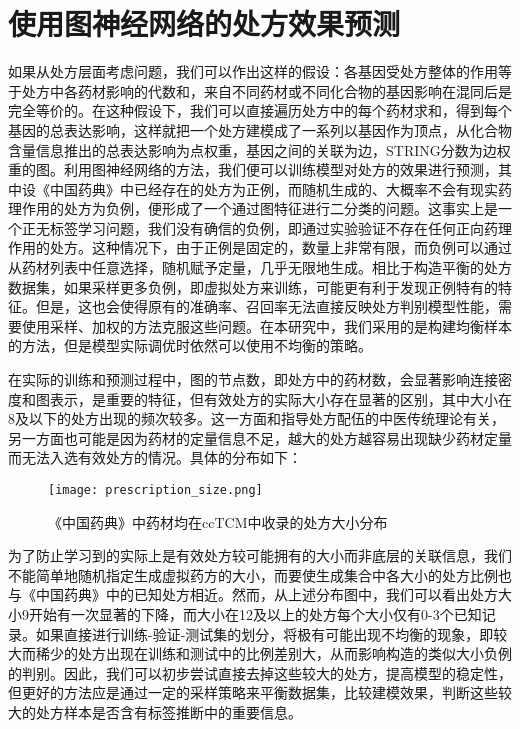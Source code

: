 \section{使用图神经网络的处方效果预测}

如果从处方层面考虑问题，我们可以作出这样的假设：各基因受处方整体的作用等于处方中各药材影响的代数和，来自不同药材或不同化合物的基因影响在混同后是完全等价的。在这种假设下，我们可以直接遍历处方中的每个药材求和，得到每个基因的总表达影响，这样就把一个处方建模成了一系列以基因作为顶点，从化合物含量信息推出的总表达影响为点权重，基因之间的关联为边，STRING分数为边权重的图。利用图神经网络的方法，我们便可以训练模型对处方的效果进行预测，其中设《中国药典》中已经存在的处方为正例，而随机生成的、大概率不会有现实药理作用的处方为负例，便形成了一个通过图特征进行二分类的问题。这事实上是一个正无标签学习问题，我们没有确信的负例，即通过实验验证不存在任何正向药理作用的处方。这种情况下，由于正例是固定的，数量上非常有限，而负例可以通过从药材列表中任意选择，随机赋予定量，几乎无限地生成。相比于构造平衡的处方数据集，如果采样更多负例，即虚拟处方来训练，可能更有利于发现正例特有的特征。但是，这也会使得原有的准确率、召回率无法直接反映处方判别模型性能，需要使用采样、加权的方法克服这些问题。在本研究中，我们采用的是构建均衡样本的方法，但是模型实际调优时依然可以使用不均衡的策略。

在实际的训练和预测过程中，图的节点数，即处方中的药材数，会显著影响连接密度和图表示，是重要的特征，但有效处方的实际大小存在显著的区别，其中大小在8及以下的处方出现的频次较多。这一方面和指导处方配伍的中医传统理论有关，另一方面也可能是因为药材的定量信息不足，越大的处方越容易出现缺少药材定量而无法入选有效处方的情况。具体的分布如下：


\begin{figure}[H]
  \centering
  \texttt{[image: prescription\_size.png]}
  \caption{《中国药典》中药材均在ccTCM中收录的处方大小分布}
  \label{fig:prescription_size}
\end{figure}

为了防止学习到的实际上是有效处方较可能拥有的大小而非底层的关联信息，我们不能简单地随机指定生成虚拟药方的大小，而要使生成集合中各大小的处方比例也与《中国药典》中的已知处方相近。然而，从上述分布图中，我们可以看出处方大小9开始有一次显著的下降，而大小在12及以上的处方每个大小仅有0-3个已知记录。如果直接进行训练-验证-测试集的划分，将极有可能出现不均衡的现象，即较大而稀少的处方出现在训练和测试中的比例差别大，从而影响构造的类似大小负例的判别。因此，我们可以初步尝试直接去掉这些较大的处方，提高模型的稳定性，但更好的方法应是通过一定的采样策略来平衡数据集，比较建模效果，判断这些较大的处方样本是否含有标签推断中的重要信息。

